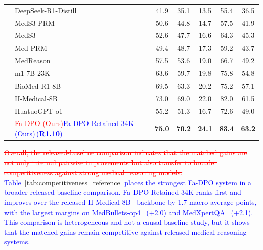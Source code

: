 \documentclass[a4paper,fleqn,doubleblind]{cas-sc}
\DeclareRobustCommand{\deleted}[1]{\textcolor{red}{\sout{#1}}}
\DeclareRobustCommand{\added}[1]{\textcolor{blue}{#1}}
\DeclareRobustCommand{\revtag}[1]{\textcolor{blue}{\scriptsize\,(\textbf{#1})}}
\begin{document}
\begin{table}[htbp]
{\begin{tabular}{l l c c c c c}
     & DeepSeek-R1-Distill~\cite{deepseek2025r1} & 41.9 & 35.1 & 13.5 & 55.4 & 36.5 \\
     & MedS3-PRM~\cite{jiang2026meds3} & 50.6 & 44.8 & 14.7 & 57.5 & 41.9 \\
     & MedS3~\cite{jiang2026meds3} & 52.6 & 47.7 & 16.6 & 64.3 & 45.3 \\
     & Med-PRM~\cite{yun2025medprm} & 49.4 & 48.7 & 17.3 & 59.2 & 43.7 \\
     & MedReason~\cite{wu2025medreason} & 57.5 & 53.6 & 19.0 & 66.7 & 49.2 \\
     & m1-7B-23K~\cite{huang2025m1} & 63.6 & 59.7 & 19.8 & 75.8 & 54.8 \\
     & BioMed-R1-8B~\cite{thapa2025disentangling} & 69.5 & 63.3 & 20.2 & 75.2 & 57.1 \\
     & II-Medical-8B~\cite{intelligentinternet2025iimedical8b} & 73.0 & 69.0 & 22.0 & 82.0 & 61.5 \\
     & HuatuoGPT-o1~\cite{chen2025huatuogpto1} & 55.2 & 51.3 & 16.7 & 72.6 & 49.0 \\
    & \deleted{Fa-DPO (Ours)}\added{Fa-DPO-Retained-34K (Ours)}\revtag{R1.10} & \textbf{75.0} & \textbf{70.2} & \textbf{24.1} & \textbf{83.4} & \textbf{63.2} \\
    \bottomrule
    \end{tabular}%
    }
\end{table}

\deleted{Overall, the released-baseline comparison indicates that the matched gains are not only internal pairwise improvements but also transfer to broader competitiveness against strong medical reasoning models.}
\added{Table~\ref{tab:competitiveness_reference} places the strongest Fa-DPO system in a broader released-baseline comparison. Fa-DPO-Retained-34K ranks first and improves over the released II-Medical-8B~\cite{intelligentinternet2025iimedical8b} backbone by 1.7 macro-average points, with the largest margins on MedBullets-op4~\cite{chen2025benchmarking} (+2.0) and MedXpertQA~\cite{zuo2025medxpertqa} (+2.1). This comparison is heterogeneous and not a causal baseline study, but it shows that the matched gains remain competitive against released medical reasoning systems.}
\end{document}
